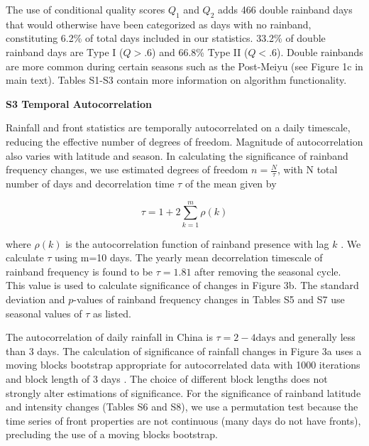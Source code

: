 \documentclass[draft,grl]{agutexSI}
\begin{document}
\begin{article}
\vspace{1mm}

	The use of conditional quality scores $Q_1$ and $Q_2$ adds 466 double rainband days that would otherwise have been categorized as days with no rainband, constituting 6.2\% of total days included in our statistics. 33.2\% of double rainband days are Type I ($Q>.6$) and 66.8\% Type II ($Q<.6$). Double rainbands are more common during certain seasons such as the Post-Meiyu (see Figure 1c in main text). Tables S1-S3 contain more information on algorithm functionality.
	
\vspace{5mm}

\noindent\textbf{{\Large S3 Temporal Autocorrelation}}

\vspace{2mm}

Rainfall and front statistics are temporally autocorrelated on a daily timescale, reducing the effective number of degrees of freedom. Magnitude of autocorrelation also varies with latitude and season. In calculating the significance of rainband frequency changes, we use estimated degrees of freedom $n=\frac{N}{\tau}$, with N total number of days and decorrelation time $\tau$ of the mean given by

\begin{equation*}
\tau=1+2\sum_{k=1}^m \rho(k)
\end{equation*}

where $\rho(k)$ is the autocorrelation function of rainband presence with lag $k$ \citep{VonStorch1999}. We calculate $\tau$ using m=10 days. The yearly mean decorrelation timescale of rainband frequency is found to be $\tau = 1.81$ after removing the seasonal cycle. This value is used to calculate significance of changes in Figure 3b. The standard deviation and $p$-values of rainband frequency changes in Tables S5 and S7 use seasonal values of $\tau$ as listed.

The autocorrelation of daily rainfall in China is $\tau =2-4 \mathrm{days}$ and generally less than 3 days. The calculation of significance of rainfall changes in Figure 3a uses a moving blocks bootstrap appropriate for autocorrelated data with 1000 iterations and block length of 3 days \citep{Singh2014}. The choice of different block lengths does not strongly alter estimations of significance. For the significance of rainband latitude and intensity changes (Tables S6 and S8), we use a permutation test because the time series of front properties are not continuous (many days do not have fronts), precluding the use of a moving blocks bootstrap.


\end{article}
\end{document}
